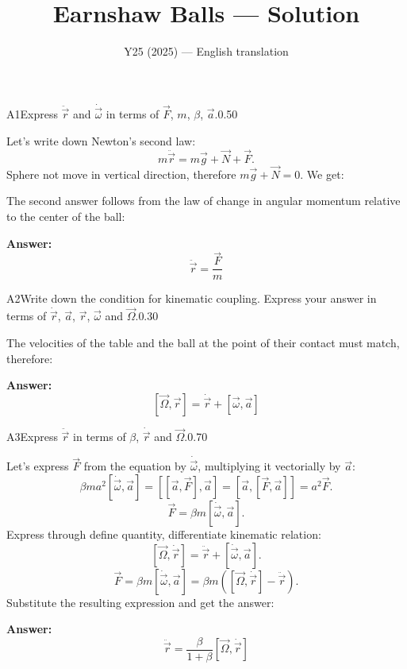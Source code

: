 \documentclass[11pt,a4paper]{article}
\title{\textbf{Earnshaw Balls --- Solution}}
\author{\normalsize Y25 (2025) — English translation}
\date{}
\begin{document}
\maketitle\vspace{-0.5em}
\begin{solcard}{A1}{Express $\ddot{\vec r}$ and $\dot{\vec\omega}$ in terms of $\vec F$, $m$, $\beta$, $\vec a$.}{0.50}

Let's write down Newton's second law: $$m\ddot{\vec r} = m\vec g + \vec N + \vec F.$$Sphere not move in vertical direction, therefore $m\vec g + \vec N = 0$. We get:


The second answer follows from the law of change in angular momentum relative to the center of the ball:

\par\smallskip\noindent\textbf{Answer:} $$\ddot{\vec r} = \frac{\vec F}{m}$$
\end{solcard}

\begin{solcard}{A2}{Write down the condition for kinematic coupling. Express your answer in terms of $\dot{\vec r}$, $\vec a$, $\vec r$, $\vec \omega$ and $\vec \Omega$.}{0.30}

The velocities of the table and the ball at the point of their contact must match, therefore:

\par\smallskip\noindent\textbf{Answer:} $$\left[\vec\Omega,\vec r\right]=\dot{\vec r} + \left[\vec\omega,\vec a\right]$$
\end{solcard}

\begin{solcard}{A3}{Express $\ddot{\vec r}$ in terms of $\beta$, $\dot{\vec r}$ and $\vec \Omega$.}{0.70}

Let's express $\vec F$ from the equation by $\dot{\vec\omega}$, multiplying it vectorially by $\vec a$: $$\beta m a^2 \left[\dot{\vec \omega},\vec a\right] = \left[ \left[\vec a, \vec F\right],\vec a\right] = \left[\vec a, \left[\vec F, \vec a\right]\right] = a^2\vec F.$$$$\vec F = \beta m\left[\dot{\vec \omega},\vec a\right].$$Express through define quantity, differentiate kinematic relation: $$\left[\vec\Omega,\dot{\vec r}\right]=\ddot{\vec r} + \left[\dot{\vec\omega},\vec a\right].$$$$\vec F = \beta m\left[\dot{\vec \omega},\vec a\right] = \beta m\left(\left[\vec\Omega,\dot{\vec r}\right]-\ddot{\vec r}\right).$$Substitute the resulting expression and get the answer:

\par\smallskip\noindent\textbf{Answer:} $$\ddot{\vec r} = \frac{\beta}{1+\beta} \left[\vec\Omega, \dot{\vec r}\right]$$
\end{solcard}
\end{document}
